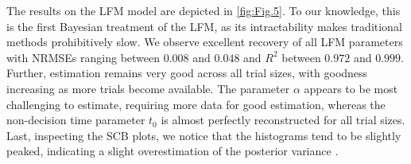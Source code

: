 \documentclass[9pt,twoside,lineno]{pnas-new}
\begin{document}
The results on the LFM model are depicted in \autoref{fig:Fig.5}. To our knowledge, this is the first Bayesian treatment of the LFM, as its intractability makes traditional methods prohibitively slow. We observe excellent recovery of all LFM parameters with NRMSEs ranging between $0.008$ and $0.048$ and $R^{2}$ between $0.972$ and $0.999$. Further, estimation remains very good across all trial sizes, with goodness increasing as more trials become available. The parameter $\alpha$ appears to be most challenging to estimate, requiring more data for good estimation, whereas the non-decision time parameter $t_{0}$ is almost perfectly reconstructed for all trial sizes. Last, inspecting the SCB plots, we notice that the histograms tend to be slightly peaked, indicating a slight overestimation of the posterior variance \cite{talts2018validating}.
\end{document}
